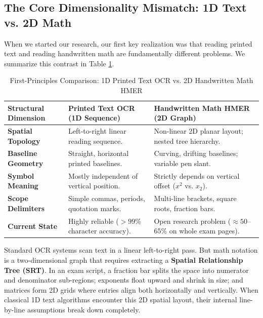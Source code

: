\subsection{The Core Dimensionality Mismatch: 1D Text vs. 2D Math}
When we started our research, our first key realization was that reading printed text and reading handwritten math are fundamentally different problems. We summarize this contrast in Table \ref{tab:1d_vs_2d_ocr}.

\begin{table}[htbp]
\centering
\caption{First-Principles Comparison: 1D Printed Text OCR vs. 2D Handwritten Math HMER}
\label{tab:1d_vs_2d_ocr}
\vspace{0.2cm}
\small
\begin{tabular}{p{2.8cm}p{5.6cm}p{5.6cm}}
\toprule
\textbf{Structural Dimension} & \textbf{Printed Text OCR (1D Sequence)} & \textbf{Handwritten Math HMER (2D Graph)} \\
\midrule
\textbf{Spatial Topology} & Left-to-right linear reading sequence. & Non-linear 2D planar layout; nested tree hierarchy. \\
\addlinespace
\textbf{Baseline Geometry} & Straight, horizontal printed baselines. & Curving, drifting baselines; variable pen slant. \\
\addlinespace
\textbf{Symbol Meaning} & Mostly independent of vertical position. & Strictly depends on vertical offset ($x^2$ vs. $x_2$). \\
\addlinespace
\textbf{Scope Delimiters} & Simple commas, periods, quotation marks. & Multi-line brackets, square roots, fraction bars. \\
\addlinespace
\textbf{Current State} & Highly reliable ($>99\%$ character accuracy). & Open research problem ($\approx 50$--$65\%$ on whole exam pages). \\
\bottomrule
\end{tabular}
\end{table}

Standard OCR systems scan text in a linear left-to-right pass. But math notation is a two-dimensional graph that requires extracting a \textbf{Spatial Relationship Tree (SRT)}. In an exam script, a fraction bar splits the space into numerator and denominator sub-regions; exponents float upward and shrink in size; and matrices form 2D grids where entries align both horizontally and vertically. When classical 1D text algorithms encounter this 2D spatial layout, their internal line-by-line assumptions break down completely.

